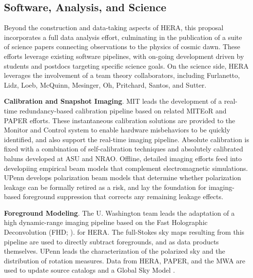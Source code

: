 \documentclass[preprint]{aastex}
\newcommand{\Mycitep}[1]{{\bf \citep{#1}}}
\newcommand{\Mycitealt}[1]{{\bf \citealt{#1}}}
\newcommand{\compress}{\vspace{-0.25in}}
\begin{document}
\compress
\subsection{Software, Analysis, and Science}
\label{sec:analysis}

Beyond the construction and data-taking aspects of HERA, this proposal
incorporates a full data analysis effort, culminating in the publication of a
suite of science papers connecting observations to the physics of cosmic dawn.
These efforts leverage existing software pipelines, with on-going 
development driven by students and postdocs targeting specific science goals.
On the science side, HERA leverages the involvement of a team theory collaborators,
including Furlanetto, Lidz, Loeb, McQuinn, Mesinger, Oh, Pritchard, Santos, and Sutter.


{\bf Calibration and Snapshot Imaging}. MIT leads
the development of a real-time redundancy-based calibration pipeline based on related
MITEoR and PAPER efforts.
These instantaneous calibration solutions are provided to
the Monitor and Control system to enable 
hardware misbehaviors to be quickly identified, and also support the
real-time imaging pipeline.  Absolute calibration is fixed with
a combination of self-calibration techniques and absolutely calibrated baluns developed at ASU and NRAO.
Offline, detailed imaging efforts feed into developiing
empirical beam models that
complement electromagnetic simulations.  UPenn develops polarization beam models
that determine whether polarization leakage can be formally retired as 
a risk, and lay the foundation for imaging-based foreground suppression that
corrects any remaining leakage effects.


{\bf Foreground Modeling}. The U. Washington team leads the adaptation
of a high dynamic-range imaging pipeline
based on the Fast Holographic Deconvolution (FHD; \Mycitealt{sullivan_et_al2012}).
for HERA.  The full-Stokes sky maps resulting from this pipeline
are used to directly subtract foregrounds,
and as data products themselves.  UPenn leads
the characterization of the polarized sky and the
distribution of rotation measures.  Data from HERA, PAPER, and the MWA are used
to update source catalogs and a Global
Sky Model \Mycitep{deoliveira2008}. %
\end{document}

